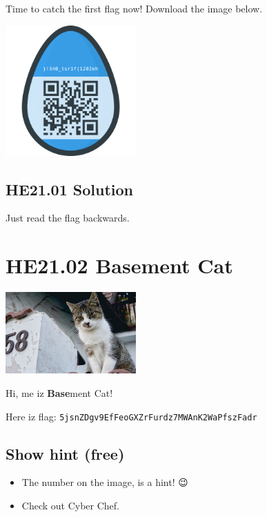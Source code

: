 \documentclass[english,a4paper,nols,noindent]{tufte-handout}
\begin{document}
Time to catch the first flag now! Download the image below.
\begin{marginfigure}
    \includegraphics[width=50mm]{ch01/first_egg.png}
\end{marginfigure}

\hypertarget{he21.01-solution}{%
\subsection{HE21.01 Solution}\label{he21.01-solution}}

Just read the flag backwards.

\hypertarget{he21.02}{%
\section{HE21.02 Basement Cat}\label{he21.02}}

\begin{marginfigure}
    \includegraphics[width=50mm]{images/challenge2.jpg}
\end{marginfigure}
Hi, me iz \textbf{Base}ment Cat!

\noindent Here iz flag: \verb+5jsnZDgv9EfFeoGXZrFurdz7MWAnK2WaPfszFadr+

\subsection{Show hint (free)}

\begin{itemize}
\item The number on the image, is a hint! {\NotoEmoji 😉}
\item Check out Cyber Chef.
\end{itemize}
\end{document}
